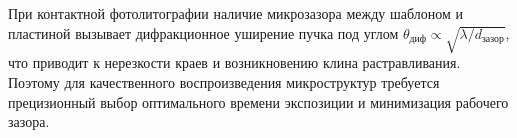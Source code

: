 \documentclass[12pt,a4paper]{article}
\theoremstyle{plain}
\theoremstyle{definition}
\theoremstyle{remark}
\numberwithin{equation}{section}
\begin{document}
При контактной фотолитографии наличие микрозазора между шаблоном и пластиной вызывает дифракционное 
уширение пучка под углом $\theta_\text{диф} \propto \sqrt{\lambda / d_\text{зазор}}$, что приводит к нерезкости 
краев и возникновению клина растравливания. Поэтому для качественного воспроизведения микроструктур 
требуется прецизионный выбор оптимального времени экспозиции и минимизация рабочего зазора.
\end{document}
